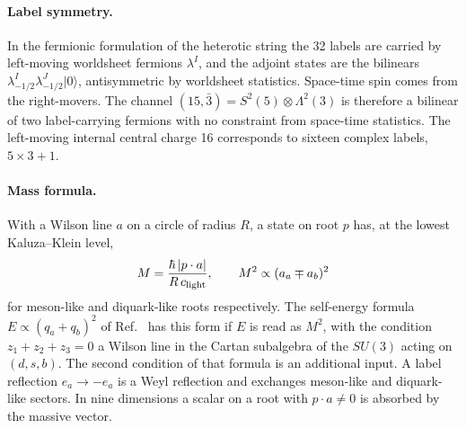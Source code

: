 \paragraph{Label symmetry.}
In the fermionic formulation of the heterotic string the 32 labels are
carried by left-moving worldsheet fermions $\lambda^I$, and the adjoint
states are the bilinears $\lambda^I_{-1/2}\lambda^J_{-1/2}|0\rangle$,
antisymmetric by worldsheet statistics. Space-time spin comes from the
right-movers. The channel $(15,\bar3)=S^2(5)\otimes\Lambda^2(3)$ is
therefore a bilinear of two label-carrying fermions with no constraint
from space-time statistics. The left-moving internal central charge 16
corresponds to sixteen complex labels, $5\times3+1$.

\paragraph{Mass formula.}
With a Wilson line $a$ on a circle of radius $R$, a state on root $p$
has, at the lowest Kaluza--Klein level,
\begin{equation}
M=\frac{\hbar\,|p\cdot a|}{R\,c_{\rm light}},\qquad
M^2\propto(a_a\mp a_b)^2
\label{eq:wilsonmass}
\end{equation}
for meson-like and diquark-like roots respectively. The self-energy
formula $E\propto(q_a+q_b)^2$ of Ref.~\cite{Rivero2024} has this form if
$E$ is read as $M^2$, with the condition $z_1+z_2+z_3=0$ a Wilson line in
the Cartan subalgebra of the $SU(3)$ acting on $(d,s,b)$. The second
condition of that formula is an additional input. A label reflection
$e_a\to-e_a$ is a Weyl reflection and exchanges meson-like and
diquark-like sectors. In nine dimensions a scalar on a root with
$p\cdot a\neq0$ is absorbed by the massive vector.


